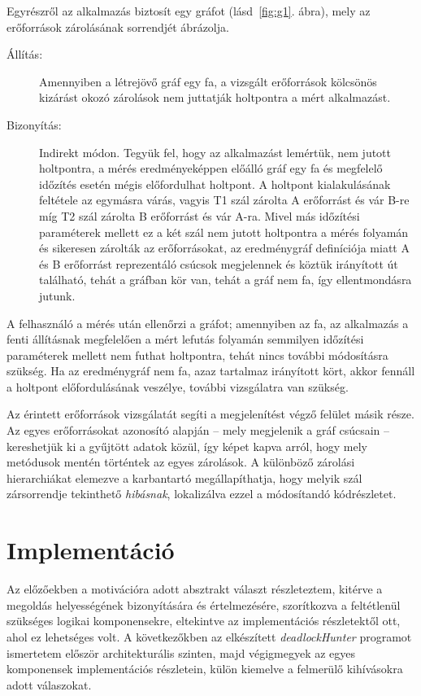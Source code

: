     Egyrészről az alkalmazás biztosít egy gráfot (lásd~\ref{fig:g1}. ábra), mely az erőforrások zárolásának sorrendjét ábrázolja. 
    \begin{description}
        \item[Állítás:]Amennyiben a létrejövő gráf egy fa, a vizsgált erőforrások kölcsönös kizárást okozó zárolások nem juttatják holtpontra a mért alkalmazást.
        \item[Bizonyítás:]Indirekt módon. Tegyük fel, hogy az alkalmazást lemértük, nem jutott holtpontra, a mérés eredményeképpen előálló gráf egy fa és megfelelő időzítés esetén mégis előfordulhat holtpont. A holtpont kialakulásának feltétele az egymásra várás, vagyis T1 szál zárolta A erőforrást és vár B-re míg T2 szál zárolta B erőforrást és vár A-ra. Mivel más időzítési paraméterek mellett ez a két szál nem jutott holtpontra a mérés folyamán és sikeresen zárolták az erőforrásokat, az eredménygráf definíciója miatt A és B erőforrást reprezentáló csúcsok megjelennek és köztük irányított út található, tehát a gráfban kör van, tehát a gráf nem fa, így ellentmondásra jutunk.
    \end{description}
%    
    A felhasználó a mérés után ellenőrzi a gráfot; amennyiben az fa, az alkalmazás a fenti állításnak megfelelően a mért lefutás folyamán semmilyen időzítési paraméterek mellett nem futhat holtpontra, tehát nincs további módosításra szükség. Ha az eredménygráf nem fa, azaz tartalmaz irányított kört, akkor fennáll a holtpont előfordulásának veszélye, további vizsgálatra van szükség.
    
    Az érintett erőforrások vizsgálatát segíti a megjelenítést végző felület másik része. Az egyes erőforrásokat azonosító alapján -- mely megjelenik a gráf csúcsain -- kereshetjük ki a gyűjtött adatok közül, így képet kapva arról, hogy mely metódusok mentén történtek az egyes zárolások. A különböző zárolási hierarchiákat elemezve a karbantartó megállapíthatja, hogy melyik szál zársorrendje tekinthető \emph{hibásnak}, lokalizálva ezzel a módosítandó kódrészletet.
    
    \section{Implementáció}
    Az előzőekben a motivációra adott absztrakt választ részleteztem, kitérve a megoldás helyességének bizonyítására és értelmezésére, szorítkozva a feltétlenül szükséges logikai komponensekre, eltekintve az implementációs részletektől ott, ahol ez lehetséges volt. A következőkben az elkészített \emph{deadlockHunter} programot ismertetem először architekturális szinten, majd végigmegyek az egyes komponensek implementációs részletein, külön kiemelve a felmerülő kihívásokra adott válaszokat.
    
